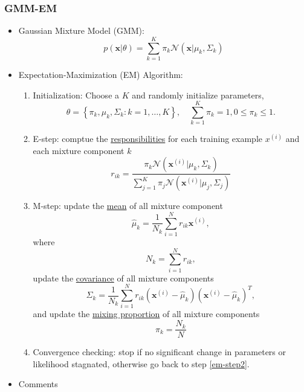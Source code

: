 \documentclass[twocolumn,landscape,10pt]{article}
\theoremstyle{definition}
\begin{document}
\subsubsection{GMM-EM}

\begin{itemize}
    \item Gaussian Mixture Model (GMM):
        \[
            p(\mathbf{x}|\theta)=\sum_{k=1}^{K}
            \pi_k\mathcal{N}(\mathbf{x}|\mu_k,\Sigma_k)
        \]
    \item Expectation-Maximization (EM) Algorithm:
        \begin{enumerate}
            \item Initialization: Choose a $K$ and randomly initialize
                parameters,
                \[
                    \theta=\left\{\pi_k,\mu_k,\Sigma_k:k=1,\ldots,K\right\},\quad
                    \sum_{k=1}^{K} \pi_k=1,0\le\pi_k\le 1.
                \]
            \item \label{em-step2} E-step: comptue the \underline{responsibilities} for each
                training example $x^{(i)}$ and each mixture component $k$
                \[
                    r_{ik}=\frac{\pi_k\mathcal{N}(\mathbf{x}^{(i)}|\mu_k,\Sigma_k)}
                    {\sum_{j=1}^{K}\pi_j\mathcal{N}(\mathbf{x}^{(i)}|\mu_j,\Sigma_j)}
                \]
            \item M-step: update the \underline{mean} of all mixture component
                \[
                    \hat{\mu}_k=\frac{1}{N_k}\sum_{i=1}^{N}
                    r_{ik}\mathbf{x}^{(i)},
                \]
                where
                \[
                    N_k=\sum_{i=1}^{N} r_{ik},
                \]
                update the \underline{covariance} of all mixture components
                \[
                    \Sigma_k=\frac{1}{N_k}\sum_{i=1}^{N}r_{ik}
                    \left(\mathbf{x}^{(i)}-\hat{\mu}_k\right)
                    {\left(\mathbf{x}^{(i)}-\hat{\mu}_k\right)}^{T},
                \]
                and update the \underline{mixing proportion} of all mixture
                components
                \[
                    \pi_k=\frac{N_k}{N}
                \]
            \item Convergence checking: stop if no significant change in
                parameters or likelihood stagnated, otherwise go back to step
                \ref{em-step2}.
        \end{enumerate} 
    \item Comments
        \begin{itemize}

\end{itemize}
\end{itemize}
\end{document}
